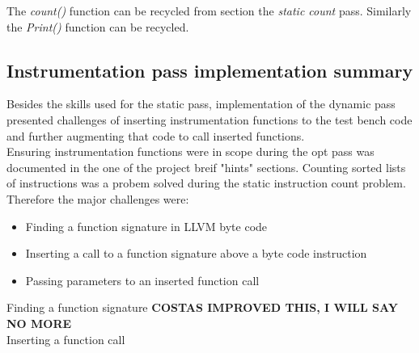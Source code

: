 The \textit{count()} function can be recycled from section the \textit{static count} pass. Similarly the \textit{Print()} function can be recycled.

\subsection{Instrumentation pass implementation summary}
Besides the skills used for the static pass, implementation of the dynamic pass presented challenges of inserting instrumentation functions to the test bench code and further augmenting that code to call inserted functions.\\
Ensuring instrumentation functions were in scope during the opt pass was documented in the one of the project breif "hints" sections. Counting sorted lists of instructions was a probem solved during the static instruction count problem. Therefore the major challenges were: 
\begin{itemize}
\item Finding a function signature in LLVM byte code
\item Inserting a call to a function signature above a byte code instruction
\item Passing parameters to an inserted function call
\end{itemize}

Finding a function signature \textbf{COSTAS IMPROVED THIS, I WILL SAY NO MORE}\\

Inserting a function call 
